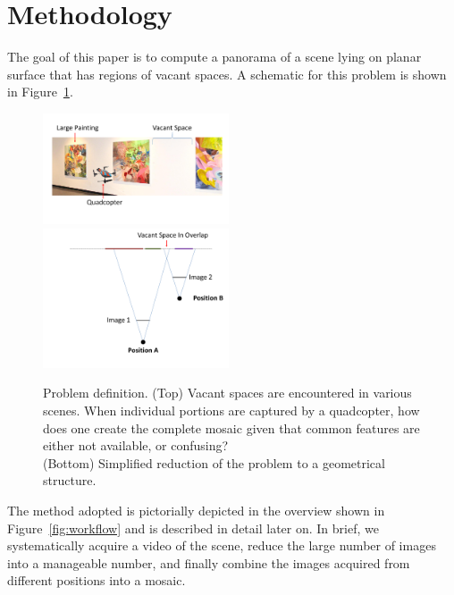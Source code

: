 \documentclass[10pt,twocolumn,letterpaper]{article}
\begin{document}

\section{Methodology}

The goal of this paper is to compute a panorama of a scene lying on
planar surface that has regions of vacant spaces.  A schematic for
this problem is shown in Figure~\ref{fig:schematic}.

\begin{figure}[h!]
  \centering
  \includegraphics[width=0.49\textwidth]{figures/indoor}\\
  \includegraphics[width=0.49\textwidth]{figures/stereoOverlap}\\

  \caption{ \label{fig:schematic} Problem definition. (Top) Vacant spaces
    are encountered in various scenes.  When individual portions are
    captured by a quadcopter, how does one create the complete mosaic
    given that common features are either not available, or
    confusing?\\
    (Bottom) Simplified reduction of the problem to a geometrical structure.
  }
\end{figure}    

The method adopted is pictorially depicted in the overview shown in
Figure~\ref{fig:workflow} and is described in detail later on.  In
brief, we systematically acquire a video of the scene, reduce the large
number of images into a manageable number, and finally combine the
images acquired from different positions into a mosaic.
\end{document}

